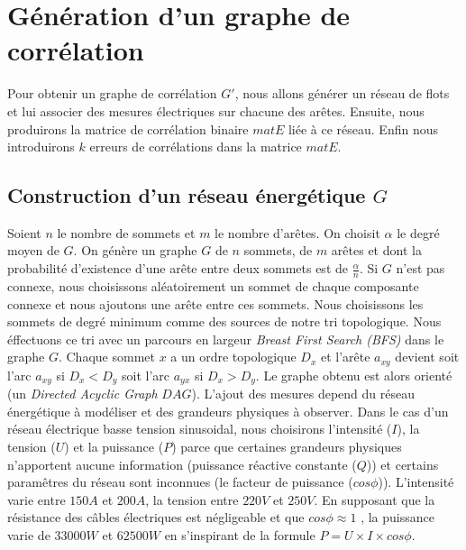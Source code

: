 \documentclass[onecolumn, 12pt]{book}
\begin{document}
\section{G\'en\'eration d'un graphe de corr\'elation}
Pour obtenir un graphe de corr\'elation $G'$, nous allons g\'en\'erer un r\'eseau de flots et   lui associer des mesures \'electriques sur chacune des ar\^etes. Ensuite, nous produirons la matrice de  corr\'elation binaire $matE$ li\'ee \`a ce r\'eseau. Enfin nous introduirons $k$ erreurs de corr\'elations dans la matrice $matE$.

\subsection{Construction d'un r\'eseau \'energ\'etique $G$}
Soient $n$ le nombre de sommets et $m$ le nombre d'ar\^etes.
On choisit $\alpha$ le degr\'e moyen de $G$.
\newline
On g\'en\`ere un graphe $G$ de $n$ sommets, de $m$ ar\^etes et dont la probabilit\'e d'existence d'une ar\^ete entre deux sommets est de $\frac{\alpha}{n}$. Si $G$ n'est pas connexe, nous choisissons al\'eatoirement un sommet de chaque composante connexe et nous ajoutons une ar\^ete entre ces sommets. 
\newline
Nous choisissons les sommets de degr\'e minimum comme des sources de notre tri topologique.
Nous \'effectuons ce tri avec un parcours en largeur {\em Breast First Search (BFS)} dans le graphe $G$.
Chaque sommet $x$ a un ordre topologique $D_x$ et l'ar\^ete $a_{xy}$ devient soit l'arc $a_{xy}$ si $D_x < D_y$ soit l'arc $a_{yx}$ si $D_x > D_y$. 
Le graphe obtenu est alors orient\'e (un {\em Directed Acyclic Graph} $DAG$).
\newline
L'ajout des mesures depend du r\'eseau \'energ\'etique \`a mod\'eliser et des grandeurs physiques \`a observer. 
Dans le cas d'un r\'eseau \'electrique basse tension sinusoidal, nous choisirons l'intensit\'e ($I$), la tension ($U$) et la puissance ($P$) parce que certaines grandeurs physiques n'apportent aucune information (puissance r\'eactive constante ($Q$)) et certains param\^etres du r\'eseau sont inconnues (le facteur de puissance ($cos \phi$)).
L'intensit\'e varie entre $150A$ et $200A$, la tension entre  $220V$ et $250V$. 
En supposant que la r\'esistance des c\^ables \'electriques est n\'egligeable et que $cos \phi \approx 1$ , la puissance varie de $33000W$ et $62500W$ en s'inspirant de la formule $P = U \times I \times cos \phi$.
\end{document}

